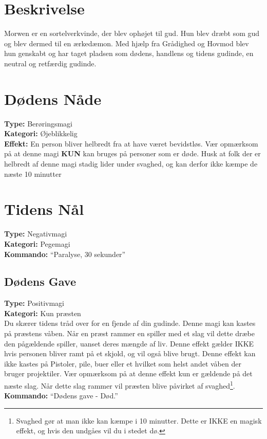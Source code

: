 \section{Beskrivelse}
Morwen er en sortelverkvinde, der blev ophøjet til gud. Hun blev dræbt som gud og blev dermed til en ærkedæmon. Med hjælp fra Grådighed og Hovmod blev hun genskabt og har taget pladsen som dødens, handlens og tidens gudinde, en neutral og retfærdig gudinde.\\

\section{Dødens Nåde}
\textbf{Type:} Berøringsmagi\\
\textbf{Kategori:} Øjeblikkelig\\
\textbf{Effekt:} En person bliver helbredt fra at have været bevidstløs. Vær opmærksom på at denne magi \textbf{KUN} kan bruges på personer som er døde. Husk at folk der er helbredt af denne magi stadig lider under svaghed, og kan derfor ikke kæmpe de næste 10 minutter

\section{Tidens Nål}
\textbf{Type:} Negativmagi\\
\textbf{Kategori:} Pegemagi\\
\textbf{Kommando:} “Paralyse, 30 sekunder”

\subsection{Dødens Gave}
\textbf{Type:} Positivmagi\\
\textbf{Kategori:} Kun præsten\\
Du skærer tidens tråd over for en fjende af din gudinde. Denne magi kan kastes på præstens våben. Når en præst rammer en spiller med et slag vil dette dræbe den pågældende spiller, uanset deres mængde af liv.
Denne effekt gælder IKKE hvis personen bliver ramt på et skjold, og vil også blive brugt. Denne effekt kan ikke kastes på Pistoler, pile, buer eller et hvilket som helst andet våben der bruger projektiler. Vær opmærksom på at denne effekt kun er gældende på det næste slag. Når dette slag rammer vil præsten blive påvirket af svaghed\footnote{Svaghed gør at man ikke kan kæmpe i 10 minutter. Dette er IKKE en magisk effekt, og hvis den undgåes vil du i stedet dø.}.\\
\textbf{Kommando:} “Dødens gave - Død.”

